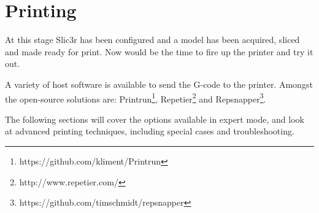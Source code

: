 
\section{Printing} %
\label{sec:printing}

At this stage Slic3r has been configured and a model has been acquired, sliced and made ready for print.  Now would be the time to fire up the printer and try it out.

A variety of host software is available to send the G-code to the printer.  Amongst the open-source solutions are: Printrun\footnote{https://github.com/kliment/Printrun}, Repetier\footnote{http://www.repetier.com/} and Repsnapper\footnote{https://github.com/timschmidt/repsnapper}.

The following sections will cover the options available in expert mode, and look at advanced printing techniques, including special cases and troubleshooting.


